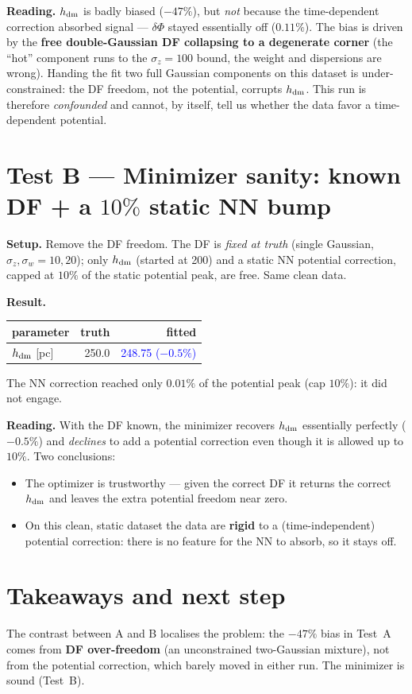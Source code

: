 \documentclass[11pt]{article}
\newcommand{\hdm}{h_{\rm dm}}
\begin{document}
\textbf{Reading.} $\hdm$ is badly biased ($-47\%$), but \emph{not} because the
time-dependent correction absorbed signal --- $\delta\Phi$ stayed essentially off
($0.11\%$). The bias is driven by the \textbf{free double-Gaussian DF collapsing
to a degenerate corner} (the ``hot'' component runs to the $\sigma_z=100$ bound,
the weight and dispersions are wrong). Handing the fit two full Gaussian
components on this dataset is under-constrained: the DF freedom, not the
potential, corrupts $\hdm$. This run is therefore \emph{confounded} and cannot,
by itself, tell us whether the data favor a time-dependent potential.

\section{Test B --- Minimizer sanity: known DF + a $10\%$ static NN bump}

\textbf{Setup.} Remove the DF freedom. The DF is \emph{fixed at truth}
(single Gaussian, $\sigma_z,\sigma_w=10,20$); only $\hdm$ (started at 200) and a
static NN potential correction, capped at $10\%$ of the static potential peak,
are free. Same clean data.

\textbf{Result.}
\begin{center}
\begin{tabular}{lrr}
\toprule
parameter & truth & fitted \\
\midrule
$\hdm$ [pc] & 250.0 & \textcolor{blue}{248.75 \;($-0.5\%$)} \\
\bottomrule
\end{tabular}
\end{center}
The NN correction reached only $0.01\%$ of the potential peak (cap $10\%$): it
did not engage.

\textbf{Reading.} With the DF known, the minimizer recovers $\hdm$ essentially
perfectly ($-0.5\%$) and \emph{declines} to add a potential correction even though
it is allowed up to $10\%$. Two conclusions:
\begin{itemize}\itemsep2pt
  \item The optimizer is trustworthy --- given the correct DF it returns the
        correct $\hdm$ and leaves the extra potential freedom near zero.
  \item On this clean, static dataset the data are \textbf{rigid} to a
        (time-independent) potential correction: there is no feature for the NN
        to absorb, so it stays off.
\end{itemize}

\section*{Takeaways and next step}
The contrast between A and B localises the problem: the $-47\%$ bias in Test~A
comes from \textbf{DF over-freedom} (an unconstrained two-Gaussian mixture), not
from the potential correction, which barely moved in either run. The minimizer is
sound (Test~B).
\end{document}
